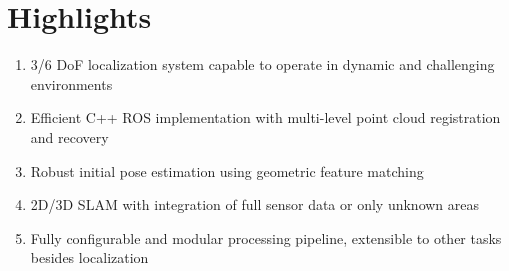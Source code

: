 \section*{Highlights}

\begin{enumerate}
\item 3/6 DoF localization system capable to operate in dynamic and challenging environments
\item Efficient C++ ROS implementation with multi-level point cloud registration and recovery
\item Robust initial pose estimation using geometric feature matching
\item 2D/3D SLAM with integration of full sensor data or only unknown areas
\item Fully configurable and modular processing pipeline, extensible to other tasks besides localization
\end{enumerate}
